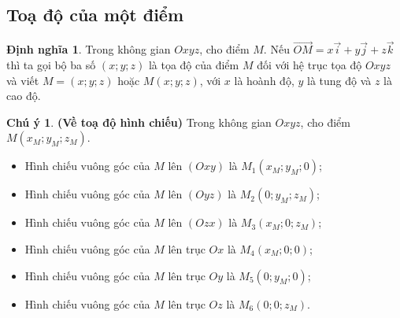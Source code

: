 \documentclass[12pt,a4paper,oneside]{book}
\theoremstyle{theorem}
\theoremstyle{definition}
\newtheorem{dn}[theorem2]{Định nghĩa}
\newtheorem{cy}[theorem2]{Chú ý}
\begin{document}
    \subsection{Toạ độ của một điểm}
    \begin{dn}
        Trong không gian $Oxyz$, cho điểm $M$. Nếu $\overrightarrow{OM}=x\vec{i}+y\vec{j}+z\vec{k}$ thì ta gọi bộ ba số $(x;y;z)$ là tọa độ của điểm $M$ đối với hệ trục tọa độ $Oxyz$ và viết $M=(x;y;z)$ hoặc $M(x;y;z)$, với $x$ là hoành độ, $y$ là tung độ và $z$ là cao độ.
    \end{dn}
    \begin{cy} \textbf{(Về toạ độ hình chiếu)}
        Trong không gian $Oxyz$, cho điểm $M(x_M;y_M;z_M)$.
        \begin{itemize}
            \item Hình chiếu vuông góc của $M$ lên $(Oxy)$ là $M_1(x_M;y_M;0)$;
            \item Hình chiếu vuông góc của $M$ lên $(Oyz)$ là $M_2(0;y_M;z_M)$;
            \item Hình chiếu vuông góc của $M$ lên $(Ozx)$ là $M_3(x_M;0;z_M)$;
            \item Hình chiếu vuông góc của $M$ lên trục $Ox$ là $M_4(x_M;0;0)$;
            \item Hình chiếu vuông góc của $M$ lên trục $Oy$ là $M_5(0;y_M;0)$;
            \item Hình chiếu vuông góc của $M$ lên trục $Oz$ là $M_6(0;0;z_M)$.
        \end{itemize}
    \end{cy}
\end{document}
